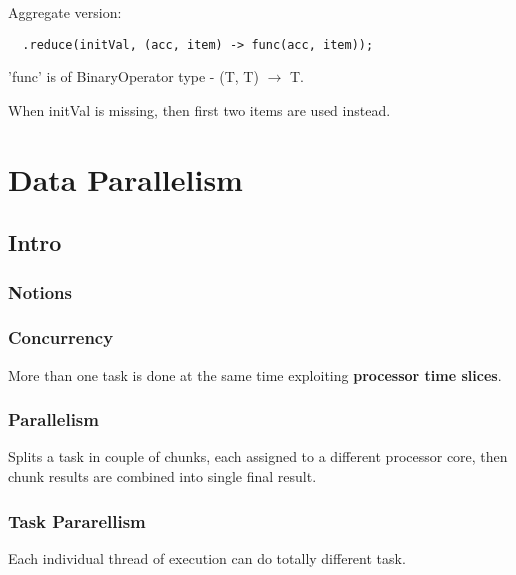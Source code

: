 \documentclass{report}
\begin{document}
Aggregate version:
\begin{verbatim}
  .reduce(initVal, (acc, item) -> func(acc, item));
\end{verbatim}
'func' is of BinaryOperator type - (T, T) $\rightarrow$ T.

When initVal is missing, then first two items are used instead.

\chapter{Data Parallelism}
\section{Intro}
\subsection{Notions}
\subsection*{Concurrency}
More than one task is done at the same time exploiting \textbf{processor time slices}.

\subsection*{Parallelism}
Splits a task in couple of chunks, each assigned to a different processor core, then chunk results are combined into single final result.

\subsection*{Task Pararellism}
Each individual thread of execution can do totally different task.
\end{document}
